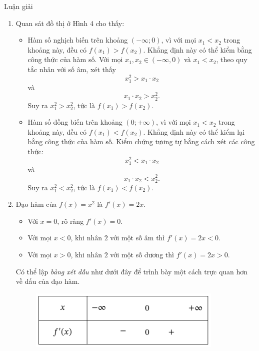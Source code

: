 \documentclass[
]{article}
\providecommand{\tightlist}{%
  \setlength{\itemsep}{0pt}\setlength{\parskip}{0pt}}\usepackage{longtable,booktabs,array}
\begin{document}
\begin{figure}
\begin{minipage}{0.50\linewidth}
\begin{figure}[H]
{}


\end{figure}%

\end{minipage}%

\end{figure}%

Luận giải

\begin{enumerate}
\def\labelenumi{\alph{enumi}.}
\item
  Quan sát đồ thị ở Hình 4 cho thấy:

  \begin{itemize}
  \tightlist
  \item
    Hàm số nghịch biến trên khoảng \((-\infty;0)\), vì với mọi
    \(x_1<x_2\) trong khoảng này, đều có \(f(x_1)>f(x_2)\). Khẳng định
    này có thể kiểm bằng công thức của hàm số. Với mọi
    \(x_1,x_2\in(-\infty,0)\) và \(x_1<x_2\), theo quy tắc nhân với số
    âm, xét thấy \[
      x_1^2 > x_1\cdot x_2
     \] và \[
      x_1\cdot x_2 > x_2^2.
     \] Suy ra \(x_1^2>x_2^2\), tức là \(f(x_1)>f(x_2)\).
  \item
    Hàm số đồng biến trên khoảng \((0;+\infty)\), vì với mọi \(x_1<x_2\)
    trong khoảng này, đều có \(f(x_1)<f(x_2)\). Khẳng định này có thể
    kiểm lại bằng công thức của hàm số. Kiểm chứng tương tự bằng cách
    xét các công thức: \[
      x_1^2 < x_1\cdot x_2
     \] và \[
      x_1\cdot x_2 < x_2^2.
     \] Suy ra \(x_1^2<x_2^2\), tức là \(f(x_1)<f(x_2)\).
  \end{itemize}
\item
  Đạo hàm của \(f(x)=x^2\) là \(f'(x)=2x\).

  \begin{itemize}
  \tightlist
  \item
    Với \(x = 0\), rõ ràng \(f'(x) = 0\).
  \item
    Với mọi \(x < 0\), khi nhân \(2\) với một số âm thì
    \(f'(x) = 2x < 0\).
  \item
    Với mọi \(x > 0\), khi nhân \(2\) với một số dương thì
    \(f'(x) = 2x > 0\).
  \end{itemize}

  Có thể lập \emph{bảng xét dấu} như dưới đây để trình bày một cách trực
  quan hơn về dấu của đạo hàm.

  \begin{figure}[H]

  {\centering \includegraphics[width=3.64583in,height=\textheight,keepaspectratio]{../../../../../../../figures/toan-thpt/toan-12/chan-troi/sach-giao-khoa/chuong-1/bai-1/hdkp1-bang-xet-dau-dh.pdf}

}
\end{figure}
\end{enumerate}
\end{document}
